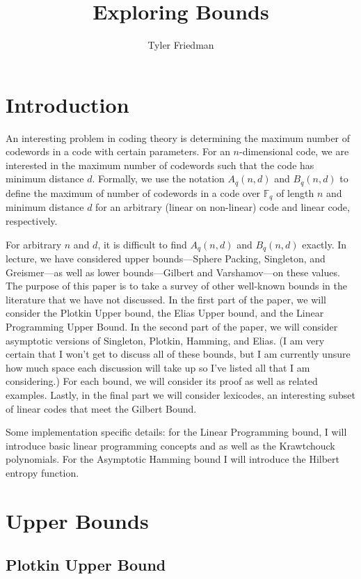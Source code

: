 \documentclass{article}
\title{Exploring Bounds}
\author{Tyler Friedman}
\theoremstyle{definition}
\numberwithin{exmp}{subsection}
\begin{document}
\maketitle

\section{Introduction}

An interesting problem in coding theory is determining the maximum
number of codewords in a code with certain parameters.  For an $n$-dimensional code, we are interested in 
the maximum number of codewords such that the code has minimum distance $d$.  
Formally, we use the notation $A_q(n,d)$
and $B_q(n,d)$ to define the maximum of number of codewords in a code over
$\mathbb{F}_q$ of length $n$ and minimum distance $d$ for an arbitrary (linear
on non-linear) code and linear code, respectively.  

For arbitrary $n$ and $d$, it is difficult to find $A_q(n,d)$ and $B_q(n,d)$ exactly.
 In lecture, we have considered upper bounds---Sphere Packing, Singleton, and Greismer---as well as
lower bounds---Gilbert and Varshamov---on these values.  The purpose of this
paper is to take a survey of other well-known bounds in the literature that we have not discussed.  
In the first part of the paper, we will consider the Plotkin Upper bound, 
the Elias Upper bound, and the Linear Programming Upper Bound.  In the second part of the paper, we will consider asymptotic versions
of Singleton, Plotkin, Hamming, and Elias.  (I am very certain that I won't get to discuss all of these bounds, but I am currently unsure how much space each discussion will take up so I've
listed all that I am considering.)  For each bound, we will consider its proof as well
as related examples.  Lastly, in the final part we will consider lexicodes, an interesting subset of linear codes that meet the Gilbert Bound.

Some implementation specific details: for the Linear Programming bound, I will introduce basic linear programming concepts and as well as the Krawtchouck polynomials.  For the 
Asymptotic Hamming bound I will introduce the Hilbert entropy function.  


\section{Upper Bounds}

\subsection{Plotkin Upper Bound}
\end{document}
